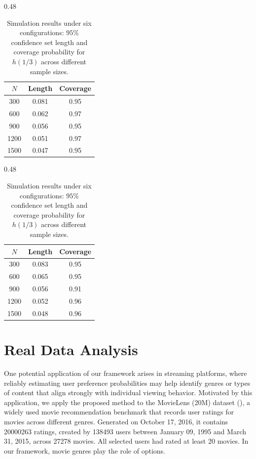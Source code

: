 \documentclass[12pt]{amsart}
\theoremstyle{plain}
\theoremstyle{remark}
\numberwithin{equation}{section}
\begin{document}
\begin{table}[htbp]
\begin{subtable}{0.48\textwidth}
\setlength{\tabcolsep}{10pt}
\begin{tabular}{ccc}
\toprule
$N$ & Length & Coverage \\
\midrule
300  & 0.081 & 0.95\\
600  & 0.062 & 0.97\\
900  & 0.056 & 0.95\\
1200 & 0.051 & 0.97\\
1500 & 0.047 & 0.95\\
\bottomrule
\end{tabular}
\centering
\caption{\centering Configuration 5: persistent intensity \\ and constant number of choices}
\end{subtable}
\hfill
\begin{subtable}{0.48\textwidth}
\setlength{\tabcolsep}{10pt}
\begin{tabular}{ccc}
\toprule
$N$ & Length & Coverage \\
\midrule
300  & 0.083 & 0.95\\
600  & 0.065 & 0.95\\
900  & 0.056 & 0.91\\
1200 & 0.052 & 0.96\\
1500 & 0.048 & 0.96\\
\bottomrule
\end{tabular}
\centering
\caption{\centering Configuration 6: persistent intensity \\ and random number of choices}
\end{subtable}
\centering
\caption{\centering Simulation results under six configurations: $95\%$ confidence set length and coverage probability for $h(1/3)$ across different sample sizes.}
\label{tab:sim2}

\end{table}

\section{Real Data Analysis}\label{sec5}

One potential application of our framework arises in streaming platforms, where reliably estimating user preference probabilities may help identify genres or types of content that align strongly with individual viewing behavior. Motivated by this application, we apply the proposed method to the MovieLens (20M) dataset (\cite{10.1145/2827872}), a widely used movie recommendation benchmark that records user ratings for movies across different genres. 
Generated on October 17, 2016, it contains 20000263 ratings, created by 138493 users between January 09, 1995 and March 31, 2015, across 27278 movies. All selected users had rated at least 20 movies. 
In our framework, movie genres play the role of options. 
\end{document}
